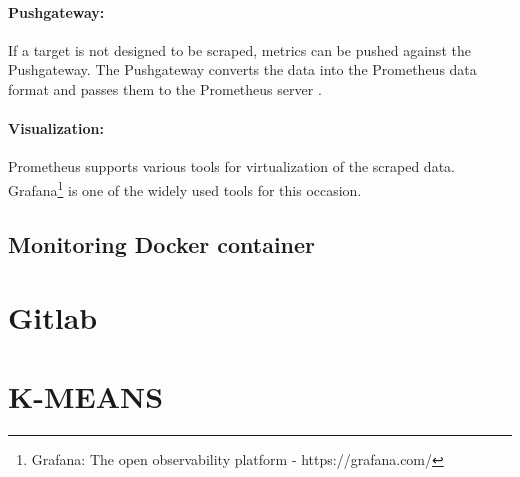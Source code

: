 \paragraph{Pushgateway:}
If a target is not designed to be scraped, metrics can be pushed against the Pushgateway\cite{Prom2020Docs}. The Pushgateway converts the data into the Prometheus data format and passes them to the Prometheus server \cite{Pandey2020Monitoring}.


\paragraph{Visualization:}
Prometheus supports various tools for virtualization of the scraped data. Grafana\footnote{Grafana: The open observability platform - https://grafana.com/} is one of the widely used tools for this occasion.




\subsection{Monitoring Docker container}


\section{Gitlab}


\section{K-MEANS}


